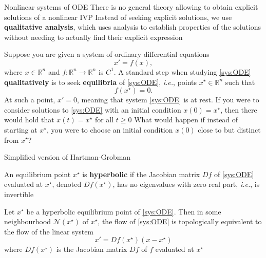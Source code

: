 \documentclass{beamer}
\def\IR{\mathbb{R}}
\def\ie{\emph{i.e.}}
\def\defword#1{\textbf{#1}}
\begin{document}
\begin{frame}{Nonlinear systems of ODE}
There is no general theory allowing to obtain explicit solutions of a nonlinear IVP
\vfill
Instead of seeking explicit solutions, we use \defword{qualitative analysis}, which uses analysis to establish properties of the solutions without needing to actually find their explicit expression
\end{frame}


\begin{frame}
Suppose you are given a system of ordinary differential equations
\begin{equation}\label{sys:ODE}
x'=f(x),
\end{equation}
where $x\in\IR^n$ and $f:\IR^n\to\IR^n$ is $C^1$. A standard step when studying \eqref{sys:ODE} \defword{qualitatively} is to seek \defword{equilibria} of \eqref{sys:ODE}, \ie, points $x^\star\in\IR^n$ such that
\begin{equation}\label{eq:equilibrium}
f(x^\star)=0.
\end{equation}
At such a point, $x'=0$, meaning that system \eqref{sys:ODE} is at rest. If you were to consider solutions to \eqref{sys:ODE} with an initial condition $x(0)=x^\star$, then there would hold that $x(t)=x^\star$ for all $t\geq 0$
\vfill
What would happen if instead of starting at $x^\star$, you were to choose an initial condition $x(0)$ close to but distinct from $x^\star$?
\end{frame}

\begin{frame}{Simplified version of Hartman-Grobman}
\begin{definition}
An equilibrium point $x^\star$ is \textbf{hyperbolic} if the Jacobian matrix $Df$ of \eqref{sys:ODE} evaluated at $x^\star$, denoted $Df(x^\star)$, has no eigenvalues with zero real part, \ie, is invertible
\end{definition}

\begin{theorem}\label{th:HartmanGrobman}
Let $x^\star$ be a hyperbolic equilibrium point of \eqref{sys:ODE}.
Then in some neighbourhood $\mathcal{N}(x^\star)$ of $x^\star$, the flow of \eqref{sys:ODE} is topologically equivalent to the flow of the linear system 
\begin{equation}\label{sys:linearized}
x'=Df(x^\star)(x-x^\star)
\end{equation} 
where $Df(x^\star)$ is the Jacobian matrix $Df$ of $f$ evaluated at $x^\star$
\end{theorem}
\end{frame}
\end{document}
